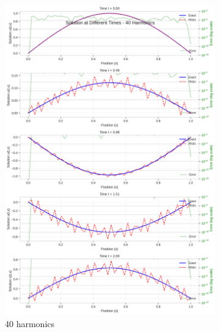 \begin{figure}[H]
\begin{subfigure}[b]{0.32\textwidth}
        \includegraphics[width=\textwidth]{figures/time_slices_40h.png}
        \caption{40 harmonics}
    \end{subfigure}
    \hfill
    \begin{subfigure}[b]{0.32\textwidth}
        \centering

\end{subfigure}
\end{figure}
